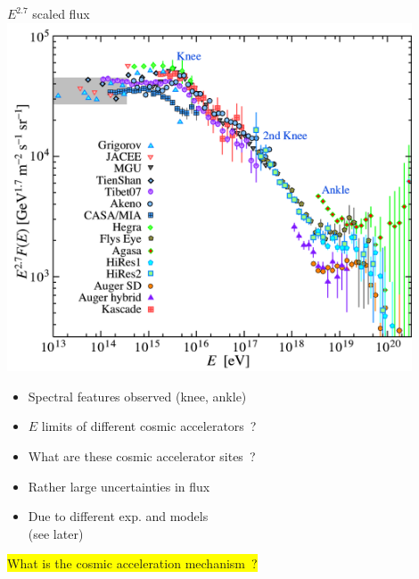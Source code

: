 \Tr
\vspace*{1.5cm}
\begin{center}
{\blue $E^{2.7}$ scaled flux}\\[5mm]
\includegraphics[keepaspectratio,width=12cm]{cr-all-scaled27}
\end{center}

\newpage

\vspace*{3cm}
\begin{itemize}
\item Spectral features observed (knee, ankle)
\item[] $E$ limits of different cosmic accelerators~?
\item[] What are these cosmic accelerator sites~?
\item Rather large uncertainties in flux 
\item[] Due to different exp. and models\\
        (see later)
\end{itemize}
%
\colorbox{yellow}{What is the cosmic acceleration mechanism~?}

